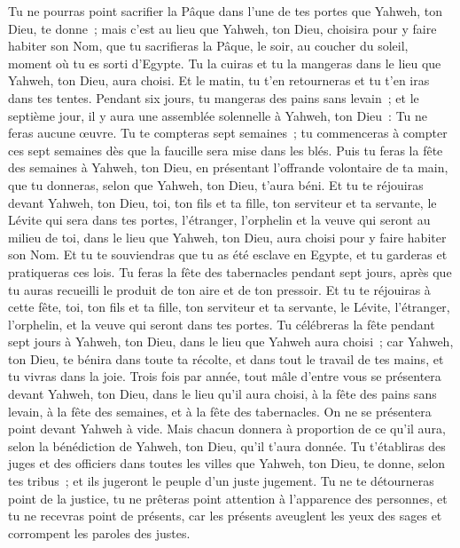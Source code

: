 \begin{multicols}{2}
Tu ne pourras point sacrifier la Pâque dans l'une de tes portes que Yahweh, ton Dieu, te donne~;
mais c'est au lieu que Yahweh, ton Dieu, choisira pour y faire habiter son Nom, que tu sacrifieras la Pâque, le soir, au coucher du soleil, moment où tu es sorti d'Egypte.
Tu la cuiras et tu la mangeras dans le lieu que Yahweh, ton Dieu, aura choisi. Et le matin, tu t'en retourneras et tu t'en iras dans tes tentes.
Pendant six jours, tu mangeras des pains sans levain~; et le septième jour, il y aura une assemblée solennelle à Yahweh, ton Dieu~: Tu ne feras aucune œuvre.
Tu te compteras sept semaines~; tu commenceras à compter ces sept semaines dès que la faucille sera mise dans les blés.
Puis tu feras la fête des semaines à Yahweh, ton Dieu, en présentant l'offrande volontaire de ta main, que tu donneras, selon que Yahweh, ton Dieu, t'aura béni.
Et tu te réjouiras devant Yahweh, ton Dieu, toi, ton fils et ta fille, ton serviteur et ta servante, le Lévite qui sera dans tes portes, l'étranger, l'orphelin et la veuve qui seront au milieu de toi, dans le lieu que Yahweh, ton Dieu, aura choisi pour y faire habiter son Nom.
Et tu te souviendras que tu as été esclave en Egypte, et tu garderas et pratiqueras ces lois.
Tu feras la fête des tabernacles pendant sept jours, après que tu auras recueilli le produit de ton aire et de ton pressoir.
Et tu te réjouiras à cette fête, toi, ton fils et ta fille, ton serviteur et ta servante, le Lévite, l'étranger, l'orphelin, et la veuve qui seront dans tes portes.
Tu célébreras la fête pendant sept jours à Yahweh, ton Dieu, dans le lieu que Yahweh aura choisi~; car Yahweh, ton Dieu, te bénira dans toute ta récolte, et dans tout le travail de tes mains, et tu vivras dans la joie.
Trois fois par année, tout mâle d'entre vous se présentera devant Yahweh, ton Dieu, dans le lieu qu'il aura choisi, à la fête des pains sans levain, à la fête des semaines, et à la fête des tabernacles. On ne se présentera point devant Yahweh à vide.
Mais chacun donnera à proportion de ce qu'il aura, selon la bénédiction de Yahweh, ton Dieu, qu'il t'aura donnée.
Tu t'établiras des juges et des officiers dans toutes les villes que Yahweh, ton Dieu, te donne, selon tes tribus~; et ils jugeront le peuple d'un juste jugement.
Tu ne te détourneras point de la justice, tu ne prêteras point attention à l'apparence des personnes, et tu ne recevras point de présents, car les présents aveuglent les yeux des sages et corrompent les paroles des justes.

\end{multicols}
